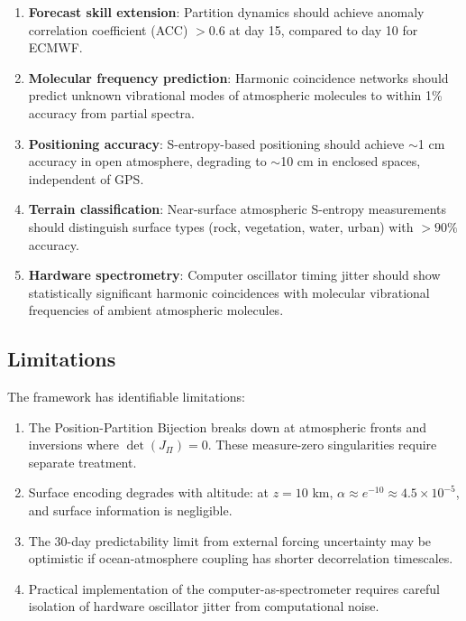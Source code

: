 \documentclass[twocolumn,10pt]{article}
\theoremstyle{definition}
\begin{document}
\begin{enumerate}[nosep]
    \item \textbf{Forecast skill extension}: Partition dynamics should achieve anomaly correlation coefficient (ACC) $> 0.6$ at day 15, compared to day 10 for ECMWF.

    \item \textbf{Molecular frequency prediction}: Harmonic coincidence networks should predict unknown vibrational modes of atmospheric molecules to within 1\% accuracy from partial spectra.

    \item \textbf{Positioning accuracy}: S-entropy-based positioning should achieve $\sim$1 cm accuracy in open atmosphere, degrading to $\sim$10 cm in enclosed spaces, independent of GPS.

    \item \textbf{Terrain classification}: Near-surface atmospheric S-entropy measurements should distinguish surface types (rock, vegetation, water, urban) with $> 90\%$ accuracy.

    \item \textbf{Hardware spectrometry}: Computer oscillator timing jitter should show statistically significant harmonic coincidences with molecular vibrational frequencies of ambient atmospheric molecules.
\end{enumerate}

\subsection{Limitations}

The framework has identifiable limitations:

\begin{enumerate}[nosep]
    \item The Position-Partition Bijection breaks down at atmospheric fronts and inversions where $\det(J_\Pi) = 0$. These measure-zero singularities require separate treatment.

    \item Surface encoding degrades with altitude: at $z = 10$ km, $\alpha \approx e^{-10} \approx 4.5 \times 10^{-5}$, and surface information is negligible.

    \item The 30-day predictability limit from external forcing uncertainty may be optimistic if ocean-atmosphere coupling has shorter decorrelation timescales.

    \item Practical implementation of the computer-as-spectrometer requires careful isolation of hardware oscillator jitter from computational noise.
\end{enumerate}
\end{document}
